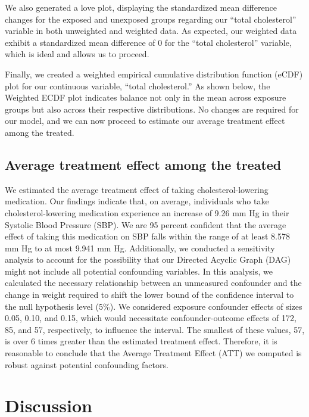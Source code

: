 \documentclass[useAMS,usenatbib,referee]{biom}
\begin{document}
We also generated a love plot, displaying the standardized mean
difference changes for the exposed and unexposed groups regarding our
``total cholesterol'' variable in both unweighted and weighted data. As
expected, our weighted data exhibit a standardized mean difference of 0
for the ``total cholesterol'' variable, which is ideal and allows us to
proceed.

Finally, we created a weighted empirical cumulative distribution
function (eCDF) plot for our continuous variable, ``total cholesterol.''
As shown below, the Weighted ECDF plot indicates balance not only in the
mean across exposure groups but also across their respective
distributions. No changes are required for our model, and we can now
proceed to estimate our average treatment effect among the treated.

\hypertarget{average-treatment-effect-among-the-treated}{%
\subsection{Average treatment effect among the
treated}\label{average-treatment-effect-among-the-treated}}

We estimated the average treatment effect of taking cholesterol-lowering
medication. Our findings indicate that, on average, individuals who take
cholesterol-lowering medication experience an increase of 9.26 mm Hg in
their Systolic Blood Pressure (SBP). We are 95 percent confident that
the average effect of taking this medication on SBP falls within the
range of at least 8.578 mm Hg to at most 9.941 mm Hg. Additionally, we
conducted a sensitivity analysis to account for the possibility that our
Directed Acyclic Graph (DAG) might not include all potential confounding
variables. In this analysis, we calculated the necessary relationship
between an unmeasured confounder and the change in weight required to
shift the lower bound of the confidence interval to the null hypothesis
level (5\%). We considered exposure confounder effects of sizes 0.05,
0.10, and 0.15, which would necessitate confounder-outcome effects of
172, 85, and 57, respectively, to influence the interval. The smallest
of these values, 57, is over 6 times greater than the estimated
treatment effect. Therefore, it is reasonable to conclude that the
Average Treatment Effect (ATT) we computed is robust against potential
confounding factors.

\hypertarget{discussion}{%
\section{Discussion}\label{discussion}}
\end{document}
